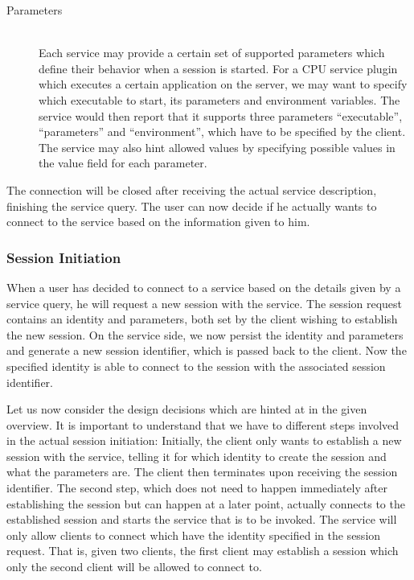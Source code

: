 \begin{description}
    \item[Parameters]\hfill\\
        Each service may provide a certain set of supported parameters which define their behavior when a session is started.
        For a CPU service plugin which executes a certain application on the server, we may want to specify which executable to start, its parameters and environment variables.
        The service would then report that it supports three parameters ``executable'', ``parameters'' and ``environment'', which have to be specified by the client.
        The service may also hint allowed values by specifying possible values in the value field for each parameter.
\end{description}

The connection will be closed after receiving the actual service description, finishing the service query.
The user can now decide if he actually wants to connect to the service based on the information given to him.

\subsubsection{Session Initiation}
\label{sec:session-initiation}

When a user has decided to connect to a service based on the details given by a service query, he will request a new session with the service.
The session request contains an identity and parameters, both set by the client wishing to establish the new session.
On the service side, we now persist the identity and parameters and generate a new session identifier, which is passed back to the client.
Now the specified identity is able to connect to the session with the associated session identifier.

Let us now consider the design decisions which are hinted at in the given overview.
It is important to understand that we have to different steps involved in the actual session initiation:
Initially, the client only wants to establish a new session with the service, telling it for which identity to create the session and what the parameters are.
The client then terminates upon receiving the session identifier.
The second step, which does not need to happen immediately after establishing the session but can happen at a later point, actually connects to the established session and starts the service that is to be invoked.
The service will only allow clients to connect which have the identity specified in the session request.
That is, given two clients, the first client may establish a session which only the second client will be allowed to connect to.

